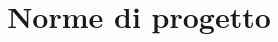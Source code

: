 \documentclass[12pt]{article}
\title{Norme di progetto}
\begin{document}
	\makefirstpage
	
	
	\clearpage
	
	\tableofcontents
	\clearpage
	
	
	
	
	\label{sec:bib}
    
    
\end{document}

